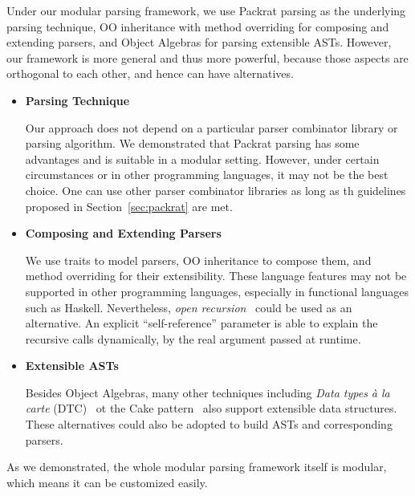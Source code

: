 Under our modular parsing framework, we use Packrat parsing as the underlying parsing technique, OO inheritance with method overriding for composing and extending parsers, and Object Algebras for parsing extensible ASTs. However, our framework is more general and thus more powerful, because those aspects are orthogonal to each other, and hence can have alternatives.

\begin{itemize}

\item {\bf Parsing Technique}

Our approach does not depend on a particular parser combinator library
or parsing algorithm. We demonstrated that Packrat parsing has some
advantages and is suitable in a modular setting. However, under
certain circumstances or in other programming languages, it may not be
the best choice. One can use other parser combinator libraries as long
as th guidelines proposed in Section~\ref{sec:packrat} are met.

\item {\bf Composing and Extending Parsers}

  We use traits to model parsers, OO inheritance to compose them, and
  method overriding for their extensibility. These language features
  may not be supported in other programming languages, especially in
  functional languages such as Haskell. Nevertheless, \textit{open
    recursion}~\cite{CookThesis} could be used as an alternative. An explicit
  ``self-reference'' parameter is able to explain the recursive calls
  dynamically, by the real argument passed at runtime.

\item {\bf Extensible ASTs}

Besides Object Algebras, many other techniques including \textit{Data
  types à la carte} (DTC)~\cite{swierstra2008data} ot the Cake pattern~\cite{odersky2005independently} also support extensible data structures. These alternatives could also be adopted to build ASTs and corresponding parsers.

\end{itemize}

As we demonstrated, the whole modular parsing framework itself is
modular, which means it can be customized easily.
